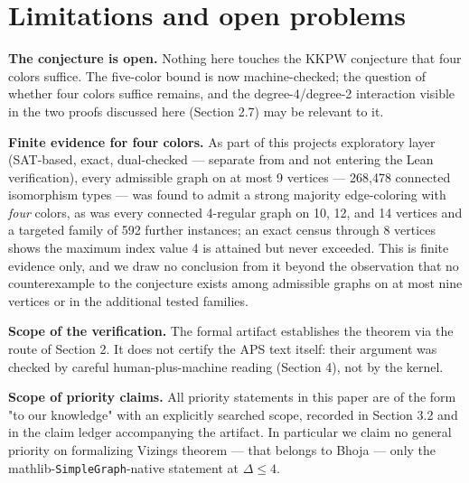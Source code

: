 \documentclass[11pt]{article}
\theoremstyle{definition}
\theoremstyle{remark}
\begin{document}
\section{Limitations and open problems}\label{6-limitations-and-open-problems}

\textbf{The conjecture is open.} Nothing here touches the KKPW conjecture that four colors suffice. The five-color bound is now machine-checked; the question of whether four colors suffice remains, and the degree-4/degree-2 interaction visible in the two proofs discussed here (Section 2.7) may be relevant to it.

\textbf{Finite evidence for four colors.} As part of this project\textquotesingle s exploratory layer (SAT-based, exact, dual-checked --- separate from and not entering the Lean verification), every admissible graph on at most 9 vertices --- 268,478 connected isomorphism types --- was found to admit a strong majority edge-coloring with \emph{four} colors, as was every connected 4-regular graph on 10, 12, and 14 vertices and a targeted family of 592 further instances; an exact census through 8 vertices shows the maximum index value 4 is attained but never exceeded. This is finite evidence only, and we draw no conclusion from it beyond the observation that no counterexample to the conjecture exists among admissible graphs on at most nine vertices or in the additional tested families.

\textbf{Scope of the verification.} The formal artifact establishes the theorem via the route of Section 2. It does not certify the APS text itself: their argument was checked by careful human-plus-machine reading (Section 4), not by the kernel.

\textbf{Scope of priority claims.} All priority statements in this paper are of the form "to our knowledge" with an explicitly searched scope, recorded in Section 3.2 and in the claim ledger accompanying the artifact. In particular we claim no general priority on formalizing Vizing\textquotesingle s theorem --- that belongs to Bhoja \cite{Bho} --- only the mathlib-\texttt{SimpleGraph}-native statement at \(\Delta \le 4\).
\end{document}
